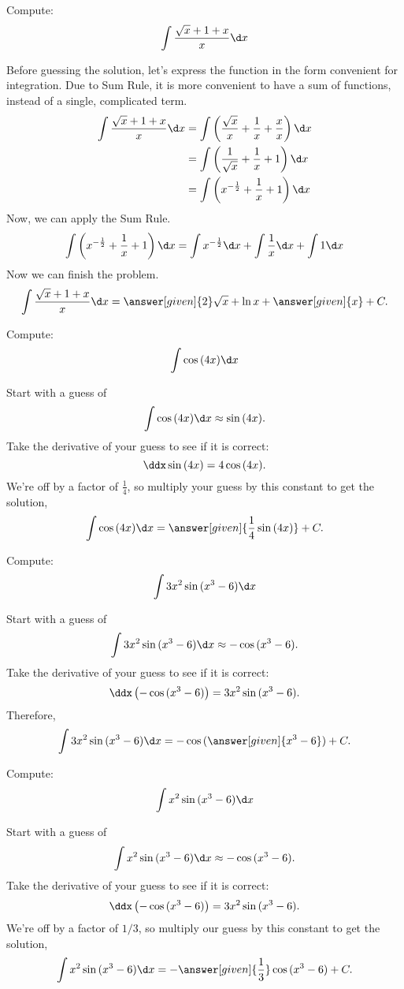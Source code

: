 \documentclass{ximera}
\begin{document}
\begin{example}
Compute:
\[
\int \frac{\sqrt{x}+1+x}{x} \d x
\]
\begin{explanation}
Before guessing the solution, let's express  the function in the form convenient for integration. Due to Sum Rule, it is more convenient to have a sum of functions, instead of a single, complicated term.
\begin{align*}
  \int \frac{\sqrt{x}+1+x}{x} \d x &=\int \left(\frac{\sqrt{x}}{x}+\frac{1}{x}+\frac{x}{x}\right) \d x\\
  &=\int \left(\frac{1}{\sqrt{x}}+\frac{1}{x}+1\right) \d x\\
  &=\int \left(x^{-\frac{1}{2}}+\frac{1}{x}+1\right) \d x
\end{align*}
Now, we can apply the Sum Rule.
\[
\int \left(x^{-\frac{1}{2}}+\frac{1}{x}+1\right) \d x=\int x^{-\frac{1}{2}}\d x+\int\frac{1}{x}\d x+\int1 \d x
\]
Now we can finish the problem.
\[
\int \frac{\sqrt{x}+1+x}{x} \d x= \answer[given]{2}\sqrt{x}+\ln{x}+ \answer[given]{x} + C.
\]
\end{explanation}
\end{example}
\begin{example}
  Compute:
  \[
  \int \cos{(4x)} \d x
  \]
  \begin{explanation}
    Start with a guess of 
    \[
    \int \cos{(4x)} \d x \approx \sin{(4x)}.
    \]
    Take the derivative of your guess to see if it is correct:
    \[
    \ddx  \sin{(4x)} = 4 \cos{(4x)}.
    \]
    We're off by a factor of $\frac{1}{4}$, so multiply your guess by this constant
    to get the solution,
    \[
  \int \cos{(4x)} \d x = \answer[given]{\frac{1}{4}\sin{(4x)}}+C.
    \]
\end{explanation}
\end{example}
\begin{example}
  Compute:
  \[
  \int 3x^2\sin{(x^3 -6)} \d x
  \]
  \begin{explanation}
    Start with a guess of 
    \[
 \int 3x^2\sin{(x^3 -6)} \d x \approx -\cos{(x^3 -6)}.
    \]
    Take the derivative of your guess to see if it is correct:
    \[
    \ddx \left(-\cos{(x^3 -6)}\right) = 3x^2\sin{(x^3 -6)}.
    \]
   Therefore,
    \[
    \int 3x^2\sin{(x^3 -6)} \d x
 =- \cos{(\answer[given]{x^3 -6})}+C.
    \]
\end{explanation}
\end{example}

\begin{example}
  Compute:
  \[
  \int x^2\sin{(x^3 -6)} \d x
  \]
  \begin{explanation}
    Start with a guess of 
    \[
 \int x^2\sin{(x^3 -6)} \d x \approx -\cos{(x^3 -6)}.
    \]
    Take the derivative of your guess to see if it is correct:
    \[
    \ddx \left(-\cos{(x^3 -6)}\right) = 3x^2\sin{(x^3 -6)}.
    \]
    We're off by a factor of $1/3$, so multiply our guess by this constant
    to get the solution,
    \[
    \int x^2\sin{(x^3 -6)} \d x
 =- \answer[given]{\frac{1}{3}}\cos{(x^3 -6)}+C.
    \]
\end{explanation}
\end{example}
\end{document}
